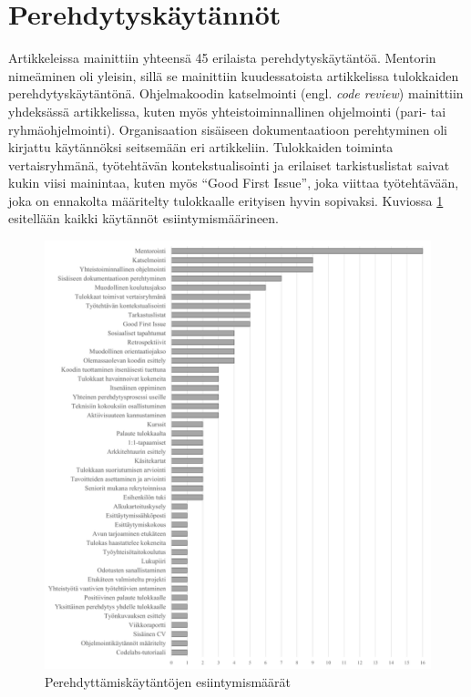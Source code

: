 \documentclass[utf8]{gradu3}
\begin{document}
\section{Perehdytyskäytännöt}
\label{luku-tulokset-kaytannot}

Artikkeleissa mainittiin yhteensä 45 erilaista perehdytyskäytäntöä. Mentorin nimeäminen oli yleisin, sillä se mainittiin kuudessatoista artikkelissa tulokkaiden perehdytyskäytäntönä. Ohjelmakoodin katselmointi (engl. \textit{code review}) mainittiin yhdeksässä artikkelissa, kuten myös yhteistoiminnallinen ohjelmointi (pari- tai ryhmäohjelmointi). Organisaation sisäiseen dokumentaatioon perehtyminen oli kirjattu käytännöksi seitsemään eri artikkeliin. Tulokkaiden toiminta vertaisryhmänä, työtehtävän kontekstualisointi ja erilaiset tarkistuslistat saivat kukin viisi mainintaa, kuten myös ``Good First Issue'', joka viittaa työtehtävään, joka on ennakolta määritelty tulokkaalle erityisen hyvin sopivaksi. Kuviossa \ref{kuvio:kaytannot} esitellään kaikki käytännöt esiintymismäärineen.

\begin{figure}[h]
    \centering
    \includegraphics[width=13.25cm]{media/45-kaytannot.png}
    \caption{Perehdyttämiskäytäntöjen esiintymismäärät}
    \label{kuvio:kaytannot}
\end{figure}
\end{document}
